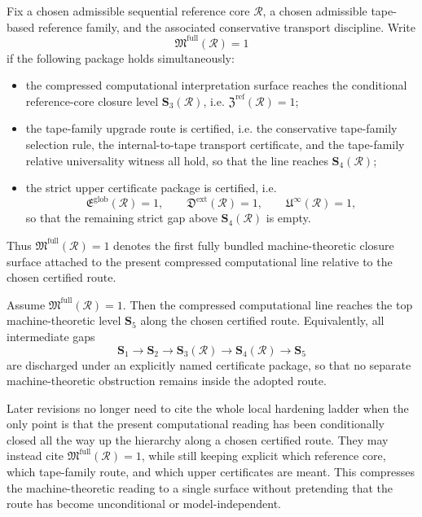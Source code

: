 \begin{definition}
Fix a chosen admissible sequential reference core \(\mathcal R\), a chosen admissible tape-based reference family, and the associated conservative transport discipline. Write
\[
\mathfrak M^{\mathrm{full}}(\mathcal R)=1
\]
if the following package holds simultaneously:
\begin{itemize}[leftmargin=2em]
 \item the compressed computational interpretation surface reaches the conditional reference-core closure level \(\mathbf S_3(\mathcal R)\), i.e. \(\mathfrak Z^{\mathrm{ref}}(\mathcal R)=1\);
 \item the tape-family upgrade route is certified, i.e. the conservative tape-family selection rule, the internal-to-tape transport certificate, and the tape-family relative universality witness all hold, so that the line reaches \(\mathbf S_4(\mathcal R)\);
 \item the strict upper certificate package is certified, i.e.
 \[
 \mathfrak E^{\mathrm{glob}}(\mathcal R)=1,\qquad
 \mathfrak D^{\mathrm{ext}}(\mathcal R)=1,\qquad
 \mathfrak U^{\infty}(\mathcal R)=1,
 \]
 so that the remaining strict gap above \(\mathbf S_4(\mathcal R)\) is empty.
\end{itemize}
Thus \(\mathfrak M^{\mathrm{full}}(\mathcal R)=1\) denotes the first fully bundled machine-theoretic closure surface attached to the present compressed computational line relative to the chosen certified route.
\end{definition}

\begin{theorem}
Assume \(\mathfrak M^{\mathrm{full}}(\mathcal R)=1\). Then the compressed computational line reaches the top machine-theoretic level \(\mathbf S_5\) along the chosen certified route. Equivalently, all intermediate gaps
\[
\mathbf S_1\longrightarrow \mathbf S_2\longrightarrow \mathbf S_3(\mathcal R)\longrightarrow \mathbf S_4(\mathcal R)\longrightarrow \mathbf S_5
\]
are discharged under an explicitly named certificate package, so that no separate machine-theoretic obstruction remains inside the adopted route.
\end{theorem}

\begin{corollary}
Later revisions no longer need to cite the whole local hardening ladder when the only point is that the present computational reading has been conditionally closed all the way up the hierarchy along a chosen certified route. They may instead cite \(\mathfrak M^{\mathrm{full}}(\mathcal R)=1\), while still keeping explicit which reference core, which tape-family route, and which upper certificates are meant. This compresses the machine-theoretic reading to a single surface without pretending that the route has become unconditional or model-independent.
\end{corollary}




